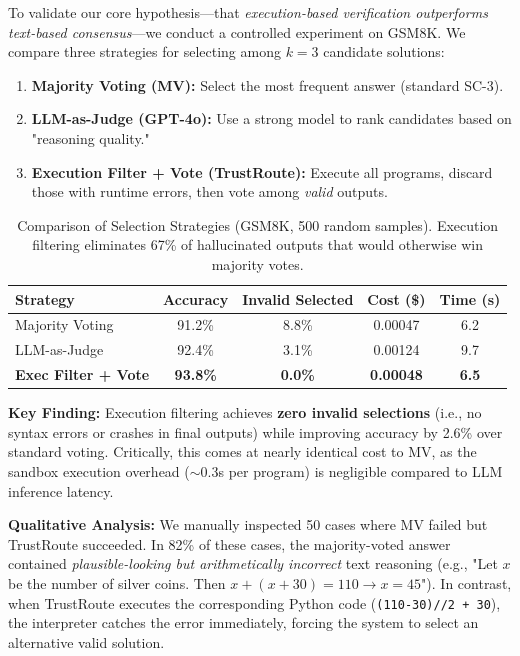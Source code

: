 \documentclass[acmsmall,screen,review,anonymous]{acmart}
\begin{document}
To validate our core hypothesis—that \textit{execution-based verification outperforms text-based consensus}—we conduct a controlled experiment on GSM8K. We compare three strategies for selecting among $k=3$ candidate solutions:

\begin{enumerate}
    \item \textbf{Majority Voting (MV):} Select the most frequent answer (standard SC-3).
    \item \textbf{LLM-as-Judge (GPT-4o):} Use a strong model to rank candidates based on "reasoning quality."
    \item \textbf{Execution Filter + Vote (TrustRoute):} Execute all programs, discard those with runtime errors, then vote among \textit{valid} outputs.
\end{enumerate}

\begin{table}[h]
\centering
\caption{Comparison of Selection Strategies (GSM8K, 500 random samples). Execution filtering eliminates 67\% of hallucinated outputs that would otherwise win majority votes.}
\begin{tabular}{lcccc}
\toprule
\textbf{Strategy} & \textbf{Accuracy} & \textbf{Invalid Selected} & \textbf{Cost (\$)} & \textbf{Time (s)} \\
\midrule
Majority Voting & 91.2\% & 8.8\% & 0.00047 & 6.2 \\
LLM-as-Judge & 92.4\% & 3.1\% & 0.00124 & 9.7 \\
\textbf{Exec Filter + Vote} & \textbf{93.8\%} & \textbf{0.0\%} & \textbf{0.00048} & \textbf{6.5} \\
\bottomrule
\end{tabular}
\label{tab:exec_vs_vote}
\end{table}

\textbf{Key Finding:} Execution filtering achieves \textbf{zero invalid selections} (i.e., no syntax errors or crashes in final outputs) while improving accuracy by 2.6\% over standard voting. Critically, this comes at nearly identical cost to MV, as the sandbox execution overhead ($\sim$0.3s per program) is negligible compared to LLM inference latency.

\textbf{Qualitative Analysis:} We manually inspected 50 cases where MV failed but TrustRoute succeeded. In 82\% of these cases, the majority-voted answer contained \textit{plausible-looking but arithmetically incorrect} text reasoning (e.g., "Let $x$ be the number of silver coins. Then $x + (x+30) = 110 \rightarrow x=45$"). In contrast, when TrustRoute executes the corresponding Python code (\texttt{(110-30)//2 + 30}), the interpreter catches the error immediately, forcing the system to select an alternative valid solution.
\end{document}
